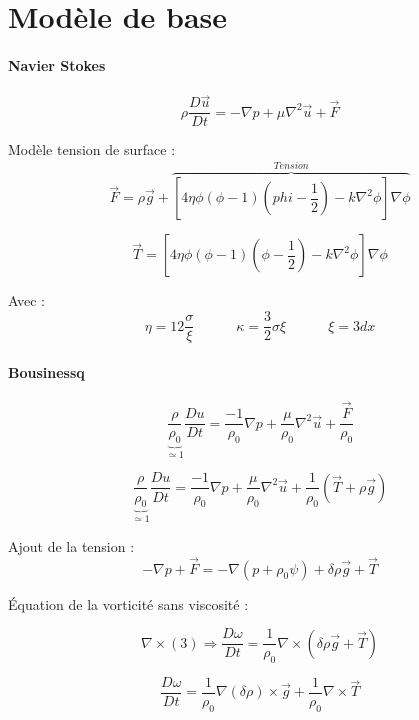 \documentclass[10pt,a4paper]{article}
\author{Malo Kerebel}
\begin{document}
\section{Modèle de base}


\paragraph{Navier Stokes }

\begin{equation}
	\rho \dfrac{D \vec{u}}{D t} = - \nabla p + \mu \nabla^2 \vec{u} + \vec{F}
\end{equation}

Modèle tension de surface :
\begin{equation}
	\vec{F} = \rho \vec{g} + \overbrace{\left[ 4 \eta \phi (\phi - 1) \left(phi - \dfrac{1}{2} \right) - k\nabla^2 \phi \right] \nabla \phi}^{Tension}
\end{equation}

\[ \vec{T} = \left[ 4 \eta \phi (\phi - 1) \left(\phi - \dfrac{1}{2} \right) - k\nabla^2 \phi \right] \nabla \phi\]

Avec :
\[
	\eta = 12 \dfrac{\sigma}{\xi} \quad \quad \quad \kappa = \dfrac{3}{2} \sigma \xi \quad \quad \quad \xi = 3 dx
\]

\paragraph{Bousinessq}

\begin{equation}
	\underbrace{\dfrac{\rho}{\rho_0}}_{\simeq 1} \dfrac{D u}{D t} = \dfrac{-1}{\rho_0} \nabla p + \dfrac{\mu }{\rho_0} \nabla^2 \vec{u} + \dfrac{\vec{F}}{\rho_0}
\end{equation}

\[
	\underbrace{\dfrac{\rho}{\rho_0}}_{\simeq 1} \dfrac{D u}{D t} = \dfrac{-1}{\rho_0} \nabla p + \dfrac{\mu }{\rho_0} \nabla^2 \vec{u} + \dfrac{1}{\rho_0}\left(\vec{T}+\rho \vec{g}\right)
\]

Ajout de la tension :
\[
	-\nabla p + \vec{F} = - \nabla (p + \rho_0 \psi) + \delta \rho \vec{g} + \vec{T}
\]

Équation de la vorticité sans viscosité :

\[
	\nabla \times (3) \Rightarrow \dfrac{D\omega}{D t} =  \dfrac{1}{\rho_0} \nabla \times \left( \delta \rho \vec{g} + \vec{T} \right)
\]

\[
	\dfrac{D\omega}{D t} = \dfrac{1}{\rho_0} \nabla (\delta \rho) \times \vec{g} + \dfrac{1}{\rho_0} \nabla \times \vec{T}
\]
\end{document}

